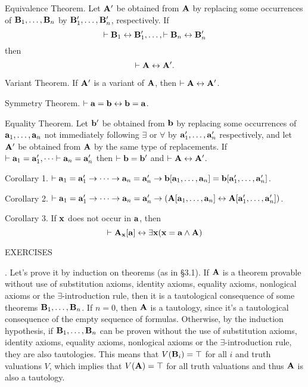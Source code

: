 
\proclaim Equivalence Theorem. Let ${\bf A}'$ be obtained from ${\bf A}$ by replacing some occurrences of ${\bf B}_1, \dots, {\bf B}_n$
by ${\bf B}_1', \dots, {\bf B}_n'$, respectively. If
$$
\vdash {\bf B}_1 \leftrightarrow {\bf B}_1', \dots, \vdash {\bf B}_n \leftrightarrow {\bf B}_n'
$$
then
$$
\vdash {\bf A} \leftrightarrow {\bf A}'.
$$

\proclaim Variant Theorem. If ${\bf A}'$ is a variant of ${\bf A}$, then $\vdash {\bf A} \leftrightarrow {\bf A}'$.

\proclaim Symmetry Theorem. $\vdash {\bf a} = {\bf b} \leftrightarrow {\bf b} = {\bf a}$.

\proclaim Equality Theorem. Let ${\bf b}'$ be obtained from ${\bf b}$ by replacing some occurrences of ${\bf a}_1, \dots, {\bf a}_n$
not immediately following $\exists$ or $\forall$ by ${\bf a}_1', \dots, {\bf a}_n'$ respectively, and let ${\bf A}'$ be
obtained from ${\bf A}$ by the same type of replacements. If $\vdash {\bf a}_1 = {\bf a}_1', \dots \vdash {\bf a}_n = {\bf a}_n'$ then
$\vdash {\bf b} = {\bf b}'$ and $\vdash {\bf A} \leftrightarrow {\bf A}'$.

\proclaim Corollary 1. $\vdash {\bf a}_1 = {\bf a}_1' \to \cdots \to {\bf a}_n = {\bf a}_n' \to {\bf b}[{\bf a}_1, \dots, {\bf a}_n] = {\bf b}[{\bf a}_1', \dots, {\bf a}_n']$.

\proclaim Corollary 2. $\vdash {\bf a}_1 = {\bf a}_1' \to \cdots \to {\bf a}_n = {\bf a}_n' \to ({\bf A}[{\bf a}_1, \dots, {\bf a}_n] \leftrightarrow {\bf A}[{\bf a}_1', \dots, {\bf a}_n'])$.

\proclaim Corollary 3. If ${\bf x}$ does not occur in ${\bf a}$, then
$$
\vdash {\bf A}_{\bf x}[{\bf a}] \leftrightarrow \exists{\bf x} ({\bf x}={\bf a} \land {\bf A})
$$

\vfill
\break

\beginsection EXERCISES

. Let's prove it by induction on theorems (as in \S3.1).
If ${\bf A}$ is a theorem provable without use of substitution axioms, 
identity axioms, equality axioms, nonlogical axioms or the $\exists$-introduction 
rule, then it is a tautological consequence of some theorems ${\bf B}_1, \dots, {\bf B}_n$.
If $n=0$, then ${\bf A}$ is a tautology, since it's a tautological consequence of the
empty sequence of formulas. Otherwise, by the induction hypothesis, if 
${\bf B}_1, \dots, {\bf B}_n$ can be proven without the use of substitution axioms, identity 
axioms, equality axioms, nonlogical axioms or the $\exists$-introduction rule, 
they are also tautologies. This means that $V({\bf B}_i) = \top$ for all $i$ and truth
valuations $V$, which implies that $V({\bf A}) = \top$ for all truth valuations and thus
${\bf A}$ is also a tautology.
\medskip

